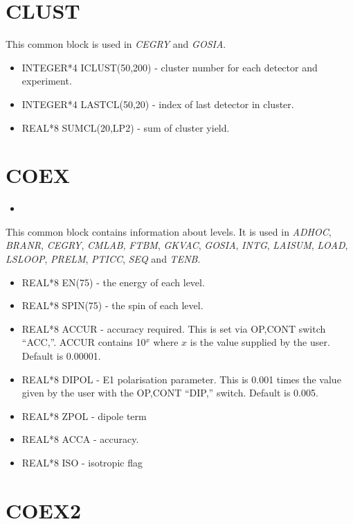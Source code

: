 \section{CLUST}

This common block is used in \emph{CEGRY} and \emph{GOSIA}.

\begin{itemize}
\item INTEGER*4 ICLUST(50,200) - cluster number for each detector and
experiment.
\item INTEGER*4 LASTCL(50,20) - index of last detector in cluster.
\item REAL*8 SUMCL(20,LP2) - sum of cluster yield.
\end{itemize}

\section{COEX}

\begin{itemize}
\item 
\end{itemize}

This common block contains information about levels. It is used in \emph{
ADHOC}, \emph{BRANR}, \emph{CEGRY}, \emph{CMLAB}, \emph{FTBM}, \emph{GKVAC}, \emph{
GOSIA}, \emph{INTG}, \emph{LAISUM}, \emph{LOAD}, \emph{LSLOOP}, \emph{PRELM},
\emph{PTICC}, \emph{SEQ} and \emph{TENB}.

\begin{itemize}
\item REAL*8 EN(75) - the energy of each level.
\item REAL*8 SPIN(75) - the spin of each level.
\item REAL*8 ACCUR - accuracy required. This is set via OP,CONT switch
``ACC,''. ACCUR contains 10$^x$ where $x$ is the value supplied by the user.
Default is 0.00001.
\item REAL*8 DIPOL - E1 polarisation parameter. This is 0.001 times the
value given by the user with the OP,CONT ``DIP,'' switch. Default is 0.005.
\item REAL*8 ZPOL - dipole term
\item REAL*8 ACCA - accuracy.
\item REAL*8 ISO - isotropic flag
\end{itemize}

\section{COEX2}

